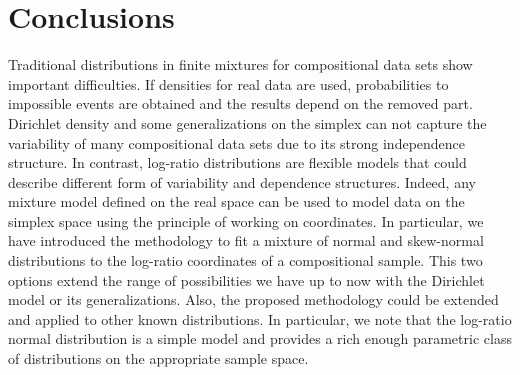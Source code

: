 \documentclass[12pt, a4paper]{article}
\begin{document}
% 


\section{Conclusions}
\label{conclusion_section}
Traditional distributions in finite mixtures for compositional data sets show important difficulties. If densities for real data are used, probabilities to impossible events are obtained and the results depend on the removed part. Dirichlet density and some generalizations on the simplex can not capture the variability of many compositional data sets due to its strong independence structure. In contrast, log-ratio distributions are flexible models that could describe different form of variability and dependence structures. Indeed, any mixture model defined on the real space can be used to model data on the simplex space using the principle of working on coordinates. In particular, we have introduced the methodology to fit a mixture of normal and skew-normal distributions to the log-ratio coordinates of a compositional sample.  This two options extend the range of possibilities we have up to now with the Dirichlet model or its generalizations. Also, the proposed methodology could be extended and applied to other known distributions. In particular, we note that the log-ratio normal distribution is a simple model and provides a rich enough parametric class of distributions on the appropriate sample space. 
\end{document}
